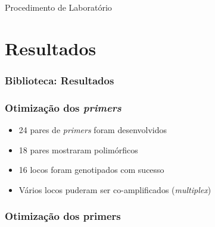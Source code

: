 \documentclass{beamer}
\begin{document}
\begin{frame}{Procedimento de Laboratório}
\centering


\end{frame}

\section{Resultados}
\begin{frame}
  \frametitle{Biblioteca: Resultados}

  \end{frame}

\begin{frame}
  \frametitle{Otimização dos \textit{primers}}
  \begin{itemize}[<+->]
  \item 24 pares de \textit{primers} foram desenvolvidos
  \item 18 pares mostraram polimórficos
  \item 16 locos foram genotipados com sucesso
    
\item Vários locos puderam ser co-amplificados (\textit{multiplex})
    \end{itemize}
  \end{frame}


  \begin{frame}
    \frametitle{Otimização dos primers}
    \centering
  \end{frame}
\end{document}
